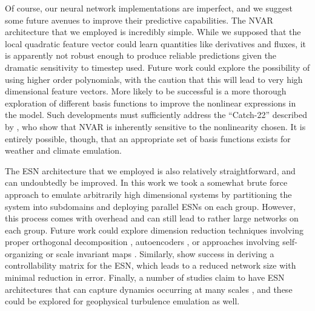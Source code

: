Of course, our neural network implementations are imperfect, and we suggest some
future avenues to improve their predictive capabilities.
The NVAR architecture that we employed is incredibly simple.
While we supposed that the local quadratic feature vector could learn
quantities like derivatives and fluxes, it is apparently not robust enough to
produce reliable predictions given the dramatic sensitivity to timestep used.
Future work could explore the possibility of using higher order polynomials,
with the caution that this will lead to very high dimensional feature vectors.
More likely to be successful is a more thorough exploration of different basis
functions to improve the nonlinear expressions in the model.
Such developments must sufficiently address the ``Catch-22''
described by \citet{zhang_catch-22_2022}, who show that NVAR is inherently
sensitive to the nonlinearity chosen.
It is entirely possible, though, that an appropriate set of basis functions exists
for weather and climate emulation.

The ESN architecture that we employed is also relatively straightforward, and
can undoubtedly be improved.
In this work we took a somewhat brute force approach to emulate arbitrarily
high dimensional systems by partitioning the system into subdomains and
deploying parallel ESNs on each group.
However, this process comes with overhead and can still lead to rather large
networks on each group.
Future work could explore dimension reduction techniques involving
proper orthogonal decomposition \citep{jordanou_investigation_2022},
autoencoders \citep{heyder_generalizability_2022},
or approaches involving self-organizing or scale invariant maps
\citep{basterrech_self-organizing_2011}.
Similarly, \citep{whiteaker_reducing_2022}
show success in deriving a controllability matrix for the
ESN, which leads to a reduced network size with minimal reduction in
error.
Finally, a number of studies claim to have ESN architectures that
can capture dynamics occurring at many scales
\citep{moon_hierarchical_2021,ma_deepr-esn_2020,gallicchio_design_2018,gallicchio_deep_2017,malik_multilayered_2017},
and these could be
explored for geophysical turbulence emulation as well.
